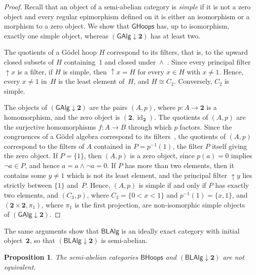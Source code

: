 \documentclass[reqno,a4paper]{amsart}
\theoremstyle{plain}
\newtheorem{proposition}[subsection]{Proposition}
\theoremstyle{definition}
\theoremstyle{remark}
\numberwithin{equation}{section}
\newcommand{\two}{\mathbf{2}}
\newcommand{\GHoops}{\ensuremath{\mathsf{GHoops}}}
\newcommand{\GAlg}{\ensuremath{\mathsf{GAlg}}}
\newcommand{\BHoops}{\ensuremath{\mathsf{BHoops}}}
\newcommand{\BLAlg}{\ensuremath{\mathsf{BLAlg}}}
\newcommand{\up}{{\uparrow}}
\DeclareMathOperator{\id}{id}
\begin{document}
\begin{proof}
Recall that an object of a semi-abelian category is \emph{simple} if it is not a zero object and every regular epimorphism defined on it is either an isomorphism or a morphism to a zero object. We show that $\GHoops$ has, up to isomorphism, exactly one simple object, whereas $(\GAlg\downarrow\two)$ has at least two.

The quotients of a G\"odel hoop $H$ correspond to its filters, that is, to the upward closed subsets of $H$ containing~$1$ and closed under~$\wedge$~\cite{BlokFerreirim}. Since every principal filter ${\up}x$ is a filter, if $H$ is simple, then ${\up}x=H$ for every $x\in H$ with $x\neq1$. Hence, every $x\neq1$ in~$H$ is the least element of~$H$, and $H\cong C_2$. Conversely, $C_2$ is simple.

The objects of $(\GAlg\downarrow\two)$ are the pairs $(A,p)$, where $p\colon A\to \two$ is a homomorphism, and the zero object is $(\two,\id_{\two})$. The quotients of $(A,p)$ are the surjective homomorphisms $f\colon A\to B$ through which $p$ factors. Since the congruences of a G\"odel algebra correspond to its filters~\cite{Hajek}, the quotients of $(A,p)$ correspond to the filters of $A$ contained in $P=p^{-1}(1)$, the filter $P$ itself giving the zero object. If $P=\{1\}$, then $(A,p)$ is a zero object, since $p(a)=0$ implies $\neg a\in P$, and hence $a=a\wedge\neg a=0$. If $P$ has more than two elements, then it contains some $y\neq1$ which is not its least element, and the principal filter ${\up}y$ lies strictly between $\{1\}$ and~$P$. Hence, $(A,p)$ is simple if and only if $P$ has exactly two elements, and $(C_3,p)$, where $C_3=\{0<x<1\}$ and $p^{-1}(1)=\{x,1\}$, and $(\two\times\two,\pi_1)$, where $\pi_1$ is the first projection, are non-isomorphic simple objects of $(\GAlg\downarrow\two)$.
\end{proof}


The same arguments show that $\BLAlg$ is an ideally exact category with initial object~$\two$, so that $(\BLAlg\downarrow\two)$ is semi-abelian.

\begin{proposition}\label{PropBLNotEquivalent}
The semi-abelian categories $\BHoops$ and $(\BLAlg\downarrow\two)$ are not equivalent.
\end{proposition}
\end{document}
